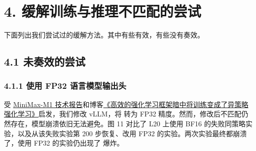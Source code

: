 


\hypertarget{src-271211a5-58b7-80b8-9a51-c4976dca1254}{}
\section*{4. 缓解训练与推理不匹配的尝试}
{}



下面列出我们尝试过的缓解方法。其中有些有效，有些没有奏效。



\hypertarget{src-271211a5-58b7-80f7-beba-e43453ed1380}{}
\subsection*{4.1 未奏效的尝试}
{}



\hypertarget{src-271211a5-58b7-80c3-96aa-ed277ca67b21}{}
\subsubsection*{4.1.1 使用 FP32 语言模型输出头}



受 \href{https://arxiv.org/abs/2506.13585}{MiniMax-M1 技术报告}和博客\href{https://fengyao.notion.site/off-policy-rl}{《高效的强化学习框架暗中将训练变成了异策略强化学习》}启发，我们修改 vLLM，将  转为 FP32 精度。然而，修改后不匹配仍然存在，模型崩溃依旧无法避免。图 11 对比了 L20 上使用 BF16  的失败同策略实验，以及从该失败实验第 200 步恢复、改用 FP32  的实验。两次实验最终都崩溃了，使用 FP32  的实验仍出现了  爆炸。



